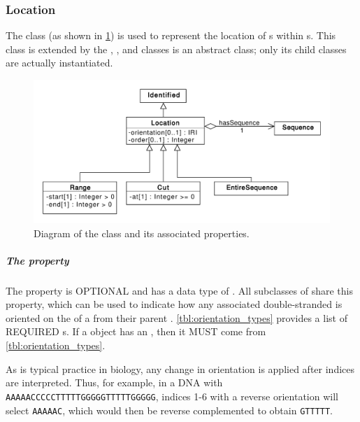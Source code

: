 \subsubsection{Location}
\label{sec:Location}

The  class (as shown in \ref{uml:location}) is used to represent the location of s within s.  This class is extended by the , , and  classes
 is an abstract class; only its child classes are actually instantiated.

\begin{figure}[ht]
\begin{center}
\includegraphics[scale=0.6]{uml/location}
\caption[]{Diagram of the  class and its associated properties.}
\label{uml:location}
\end{center}
\end{figure} 

\subparagraph{The  property}
\label{sec:orientation:L}
The  property is OPTIONAL and has a data type of . All subclasses of  share this property, which can be used to indicate how any associated double-stranded  is oriented on the  of a  from their parent . \ref{tbl:orientation_types} provides a list of REQUIRED  s. If a  object has an , then it MUST come from \ref{tbl:orientation_types}.

As is typical practice in biology, any change in orientation is applied after indices are interpreted.
Thus, for example, in a DNA  with  {\tt AAAAACCCCCTTTTTGGGGGTTTTTGGGGG}, 
indices 1-6 with a reverse orientation will select {\tt AAAAAC}, which would then be reverse complemented to obtain {\tt GTTTTT}.

